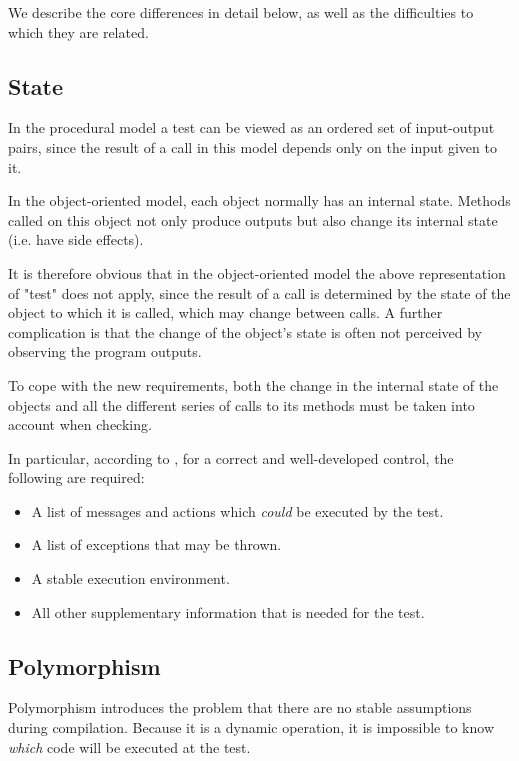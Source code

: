 \documentclass[12pt]{article}
\begin{document}
\par We describe the core differences in detail below, as well as the difficulties to which they are related.

\subsection{State}

In the procedural model a test can be viewed as an ordered set of input-output pairs, since the result of a call in this model depends only on the input given to it.

\par In the object-oriented model, each object normally has an internal state. Methods called on this object not only produce outputs but also change its internal state (i.e. have side effects).

\par It is therefore obvious that in the object-oriented model the above representation of "test" does not apply, since the result of a call is determined by the state of the object to which it is called, which may change between calls. A further complication is that the change of the object's state is often not perceived by observing the program outputs.

\par To cope with the new requirements, both the change in the internal state of the objects and all the different series of calls to its methods must be taken into account when checking.

\par In particular, according to \textcite{gordon}, for a correct and well-developed control, the following are required:

\begin{itemize}
\item A list of messages and actions which \textit{could} be executed by the test.
\item A list of exceptions that may be thrown.
\item A stable execution environment.
\item All other supplementary information that is needed for the test.
\end{itemize}

\subsection{Polymorphism}

\par Polymorphism introduces the problem that there are no stable assumptions during compilation. Because it is a dynamic operation, it is impossible to know \textit{which} code will be executed at the test.
\end{document}
